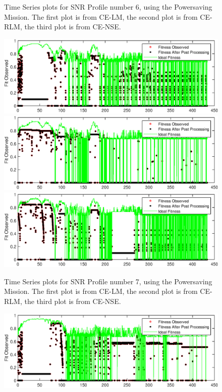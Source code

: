 \begin{appendices}
\begin{figure}[ht!]
\caption{Time Series plots for SNR Profile number 6, using the Powersaving Mission. The first plot is from CE-LM, the second plot is from CE-RLM, the third plot is from CE-NSE.}
\end{figure}
\begin{figure}[ht!]
\includegraphics{figures/c_sim_timeSeries/Fitness_timeSeries_LM_7.eps}
\includegraphics{figures/c_sim_timeSeries/Fitness_timeSeries_RLM_7.eps}
\includegraphics{figures/c_sim_timeSeries/Fitness_timeSeries_NSE_7.eps}
\caption{Time Series plots for SNR Profile number 7, using the Powersaving Mission. The first plot is from CE-LM, the second plot is from CE-RLM, the third plot is from CE-NSE.}
\end{figure}
\begin{figure}[ht!]
\includegraphics{figures/c_sim_timeSeries/Fitness_timeSeries_LM_8.eps}

\end{figure}
\end{appendices}
